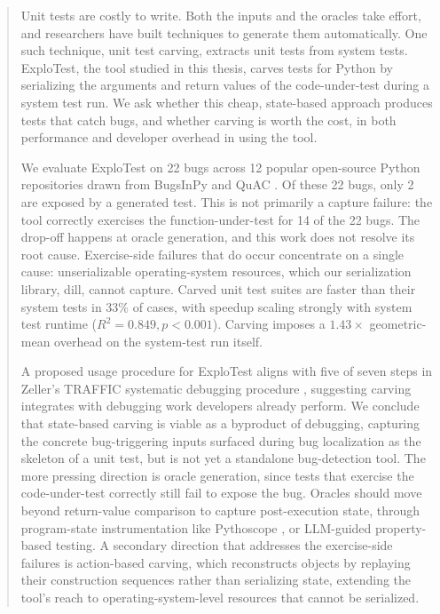 \documentclass[masc,oneside]{ubcthesis}
\begin{document}
\begin{abstract}                %
  Unit tests are costly to write. Both the inputs and the oracles take effort, and researchers have built techniques to
  generate them automatically. One such technique, unit test carving, extracts unit tests from system tests.
  ExploTest, the tool studied in this thesis, carves tests for Python by serializing the arguments and return
  values of the code-under-test during a system test run. We ask whether this cheap, state-based approach produces
  tests that catch bugs, and whether carving is worth the cost, in both performance and developer overhead in using the tool.

  We evaluate ExploTest on 22 bugs across 12 popular open-source Python repositories drawn from BugsInPy \cite{widyasari2020bugsinpy} and QuAC \cite{wu2024quac}.
  Of these 22 bugs, only 2 are exposed by a generated test. This is not primarily a capture failure: the tool correctly exercises the function-under-test
  for 14 of the 22 bugs. The drop-off happens at oracle generation, and this work does not resolve its root cause. Exercise-side failures that do occur
  concentrate on a single cause: unserializable operating-system resources, which our serialization library, dill, cannot capture. Carved unit test suites
  are faster than their system tests in 33\% of cases, with speedup scaling strongly with system test runtime ($R^2 = 0.849, p < 0.001$). Carving
  imposes a $1.43 \times$ geometric-mean overhead on the system-test run itself.

  A proposed usage procedure for ExploTest aligns with five of seven steps in Zeller's TRAFFIC systematic debugging procedure \cite{zeller2009programs},
  suggesting carving integrates with debugging work developers already perform.
  We conclude that state-based carving is viable as a byproduct of debugging, capturing the concrete bug-triggering inputs surfaced during
  bug localization as the skeleton of a unit test, but is not yet a standalone bug-detection tool.
  The more pressing direction is oracle generation, since tests that exercise the code-under-test correctly still fail to expose the bug.
  Oracles should move beyond return-value comparison to capture post-execution state, through program-state instrumentation like Pythoscope \cite{wiatkowski2011pythoscope},
  or LLM-guided property-based testing.
  A secondary direction that addresses the exercise-side failures is action-based carving,
  which reconstructs objects by replaying their construction sequences rather than serializing state,
  extending the tool's reach to operating-system-level resources that cannot be serialized.


\end{abstract}
\end{document}
